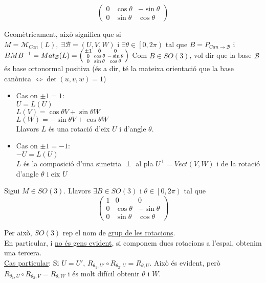 \documentclass[../main.tex]{subfiles}
\begin{document}
\begin{itemize}
\begin{proposicio}
\begin{displaymath}
\begin{pmatrix}
                0 & \cos{\theta} & -\sin{\theta}\\
                0 & \sin{\theta} & \cos{\theta}
            \end{pmatrix}
        \end{displaymath}
    \end{proposicio}
    Geomètricament, això significa que si $M = \mathcal{M}_{\textit{Can}} (L),\; \exists \mathcal{B} = \left(U, V, W\right)\text{ i }\exists \theta \in \left[0, 2\pi\right)$
    tal que $B = P_{\textit{Can}\to\mathcal{B}}$ i $BMB^{-1} = Mat_\mathcal{B}(L) = \begin{psmallmatrix}
        \pm 1 & 0 & 0\\
        0 & \cos{\theta} & -\sin{\theta}\\
        0 & \sin{\theta} & \cos{\theta}
    \end{psmallmatrix}$
    Com $B \in SO(3)$, vol dir que la base $\mathcal{B}$ és base ortonormal positiva (és a dir, té
    la mateixa orientació que la base canònica $\Leftrightarrow \det{\left(u,v,w\right)} = 1$)
    \begin{itemize}
        \item Cas on $\pm 1 = 1$:\\
        $U = L(U)$\\
        $L(V) = \cos{\theta}V + \sin{\theta}W$\\
        $L(W) = -\sin{\theta}V + \cos{\theta}W$\\
        Llavors $L$ és una rotació d'eix $U$ i d'angle $\theta$.
        \item Cas on $\pm 1 = -1$:\\
        $-U = L(U)$\\
        $L$ és la composició d'una simetria $\perp$ al pla $U^\perp = Vect(V, W)$ i de la rotació
        d'angle $\theta$ i eix $U$
    \end{itemize}
    \begin{teorema}
        Sigui $M\in SO(3)$. Llavors $\exists B \in SO(3)$ i $\theta \in \left[0, 2\pi\right)$ tal que
        \begin{displaymath}
            \begin{pmatrix}
                1 & 0 & 0\\
                0 & \cos{\theta} & -\sin{\theta}\\
                0 & \sin{\theta} & \cos{\theta}
            \end{pmatrix}
        \end{displaymath}
    \end{teorema}
    Per això, $SO(3)$ rep el nom de \underline{grup de les rotacions}.\\
    En particular, i \underline{no és gens evident}, si componem dues rotacions a l'espai, obtenim
    una tercera.\\
    \underline{Cas particular}: Si $U = U'$, $R_{\theta_1,U'}\circ R_{\theta_2,U} = R_{\theta,U}$.
    Això és evident, però $R_{\theta_1,U}\circ R_{\theta_2,V} = R_{\theta,W}$ i és molt difícil
    obtenir $\theta$ i $W$.
\end{itemize}
\end{document}
